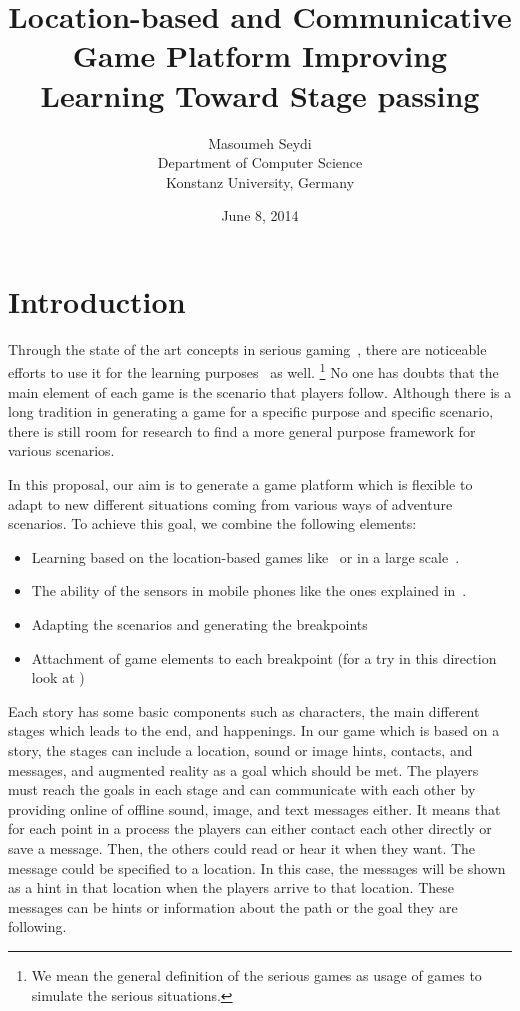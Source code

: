 \documentclass[conference]{IEEEtran}
\title{Location-based and Communicative Game Platform Improving Learning
Toward Stage passing}
\date{June 8, 2014}
\author{Masoumeh Seydi\\ Department of Computer Science\\
       Konstanz University, Germany}
\begin{document}
\maketitle

\section{Introduction}
Through the state of the art concepts in serious gaming~\cite{sergame1,sergame2}, 
there are noticeable efforts to use it for the learning purposes~\cite{sergame3} as well.
\footnote{We mean the general definition of the serious games as 
usage of games to simulate the serious situations.}
No one has doubts that the main element of each game is 
the scenario that players follow.
Although there is a long tradition in generating a game
for a specific purpose and specific scenario, 
there is still room for research 
to find a more general purpose framework for various scenarios.

In this proposal, our aim is to generate a game platform 
which is flexible to adapt to new different situations coming
from various ways of adventure scenarios. 
To achieve this goal, we combine the following elements:
\begin{itemize}
\item Learning based on the location-based games like~\cite{rexplorer} or in 
a large scale~\cite{scal-loc-g}.
\item The ability of the sensors in mobile phones like the ones explained in~\cite{sensors}.
\item Adapting the scenarios and generating the breakpoints
\item Attachment of game elements to each breakpoint (for a try in this direction 
look at \cite{totem})
\end{itemize}


Each story has some basic components such as characters, the main different stages which leads to the end, and happenings. In our game which is based on a story, the stages can include a location, sound or image hints, contacts, and messages, and augmented reality as a goal which should be met. The players must reach the goals in each stage and can communicate with each other by providing online of offline sound, image, and text messages either. It means that for each point in a process the players can either contact each other directly or save a message. Then, the others could read or hear it when they want. The message could be specified to a location. In this case, the messages will be shown as a hint in that location when the players arrive to that location. These messages can be hints or information about the path or the goal they are following.
\end{document}
